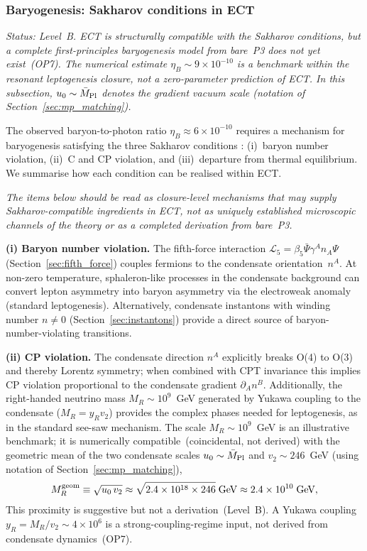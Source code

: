 \documentclass[11pt,a4paper]{article}
\numberwithin{equation}{section}
\begin{document}
\subsubsection*{Baryogenesis: Sakharov conditions in ECT}

\label{sec:baryogenesis}

\textit{Status: Level~B. ECT is structurally compatible
with the Sakharov conditions, but a complete first-principles
baryogenesis model from bare~P3 does not yet exist~(OP7).
The numerical estimate $\eta_B\sim9\times10^{-10}$ is a
benchmark within the resonant leptogenesis closure,
not a zero-parameter prediction of ECT. In this subsection,
$u_0\sim\bar M_{\rm Pl}$ denotes the gradient vacuum scale
(notation of Section~\ref{sec:mp_matching}).}

The observed baryon-to-photon ratio $\eta_B\approx6\times10^{-10}$
requires a mechanism for baryogenesis satisfying the three
Sakharov conditions \cite{Sakharov1967}: (i)~baryon number violation,
(ii)~C and CP violation, and (iii)~departure from thermal equilibrium.
We summarise how each condition can be realised within ECT.

\textit{The items below should be read as closure-level
mechanisms that may supply Sakharov-compatible ingredients
in ECT, not as uniquely established microscopic channels
of the theory or as a completed derivation from bare~P3.}

\textbf{(i) Baryon number violation.}
The fifth-force interaction $\mathcal{L}_5=\beta_5\bar\Psi\gamma^A n_A\Psi$
(Section~\ref{sec:fifth_force}) couples fermions to the condensate
orientation~$n^A$.  At non-zero temperature, sphaleron-like processes
in the condensate background can convert lepton asymmetry into baryon
asymmetry via the electroweak anomaly (standard leptogenesis).
Alternatively, condensate instantons with winding number $n\neq0$
(Section~\ref{sec:instantons}) provide a direct source of
baryon-number-violating transitions.

\textbf{(ii) CP violation.}
The condensate direction $n^A$ explicitly breaks O(4) to O(3) and
thereby Lorentz symmetry; when combined with CPT invariance this
implies CP violation proportional to the condensate gradient
$\partial_A n^B$.  Additionally, the right-handed neutrino mass
$M_R\sim10^9$~GeV generated by Yukawa coupling to the condensate
($M_R = y_R v_2$) provides the complex phases needed for leptogenesis,
as in the standard see-saw mechanism.
The scale $M_R\sim10^9$~GeV is an illustrative benchmark;
it is numerically compatible~(coincidental, not derived)
with the geometric mean of the two condensate
scales $u_0\sim\bar M_{\rm Pl}$ and $v_2\sim246$~GeV
(using notation of Section~\ref{sec:mp_matching}),
\begin{equation}
  M_R^{\rm geom} \equiv \sqrt{u_0\, v_2}
  \approx \sqrt{2.4\times10^{18}\times246}\;\text{GeV}
  \approx 2.4\times10^{10}\;\text{GeV},
\end{equation}
This proximity is suggestive but not a derivation~(Level~B).
A Yukawa coupling $y_R = M_R/v_2 \sim 4\times10^6$ is
a strong-coupling-regime input, not derived from condensate
dynamics~(OP7).
\end{document}
